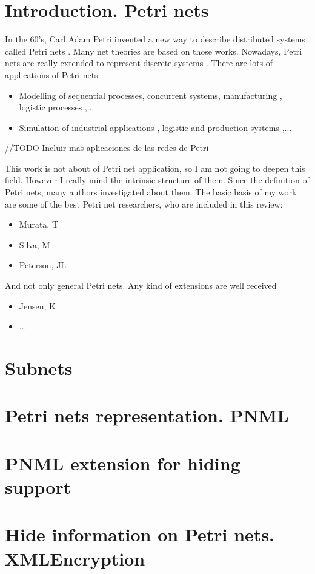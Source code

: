\section{Introduction. Petri nets}

In the 60's, Carl Adam Petri invented a new way to describe distributed systems
called Petri nets \cite{G-Petri1962PhD,G-Petri1966,G-Petri1976}. Many net
theories
are based on those works\cite{G-Petri2007}. Nowadays,
Petri nets are really extended to represent discrete systems \cite{SM-Holloway1997151,EPN-SM-Latorre2010152,EPN-SM-Latorre2010247,EPN-SM-Silva2011427}. There are lots of applications
of Petri nets:

\begin{itemize}
\item Modelling of sequential processes\cite{SM-Recalde1998267}, concurrent
systems\cite{EPN-SM-Jensen2007213,EPN-SM-Kristensen200819}, manufacturing \cite{G-Silva1989374,SM-Desrochers2010,SM-Silva19931,SM-Silva1997182,G-Silva1989374}, logistic
processes \cite{SM-Guasch2002},...
\item Simulation of industrial applications \cite{SM-Jimenez2006159,SM-Latorre2013346}, logistic and production systems \cite{SM-Jimenez2004143},...
\end{itemize} 

//TODO Incluir mas aplicaciones de las redes de Petri

This work is not about of Petri net application, so I am not
going to deepen this field. 
However I really mind the intrinsic structure of them. Since the definition
of Petri nets,
many authors investigated about them. The basic basis of my work are some of the best Petri net researchers, who are included in this review:
\begin{itemize}
\item Murata, T \cite{G-Murata1977412,G-SM-Murata19772,G-Murata1989541}
\item Silva, M \cite{G-Silva1985,G-Silva1993,G-Silva201213}
\item Peterson, JL \cite{G-EPN-Peterson1981}
\end{itemize} 

And not only general Petri nets. Any kind of extensions are well received
\begin{itemize}
\item Jensen, K \cite{EPN-SM-Jensen2007213,G-EPN-Jensen1985723}
\item ...

\end{itemize}

\section{Subnets}
\section{Petri nets representation. PNML}
\section{PNML extension for hiding support}
\section{Hide information on Petri nets. XMLEncryption}




